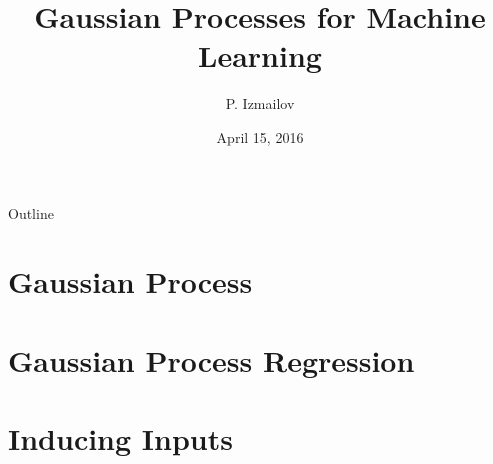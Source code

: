 \documentclass{beamer}
\title{Gaussian Processes for Machine Learning}
\author{P. Izmailov}
\date{April 15, 2016}
\begin{document}
	\begin{frame}
		\maketitle
	\end{frame}
		\begin{frame}{Outline}
			\tableofcontents[pausesections]
		\end{frame}
	\section{Gaussian Process}
		
	\section{Gaussian Process Regression}
		
	\section{Inducing Inputs}
		
\end{document}
